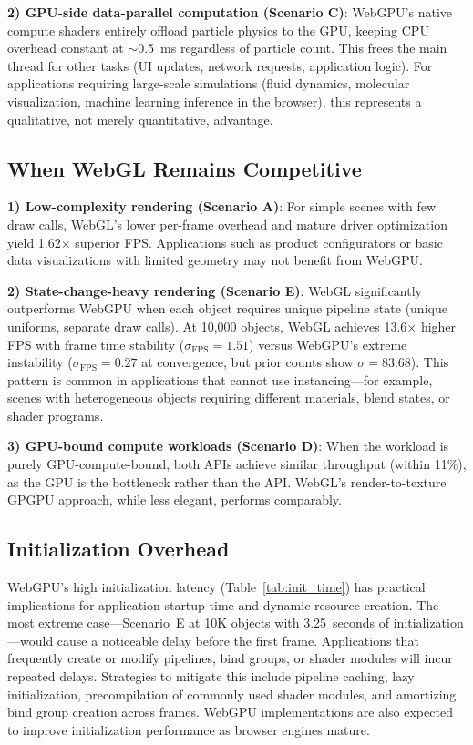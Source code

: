 \documentclass[conference]{IEEEtran}
\begin{document}
\textbf{2) GPU-side data-parallel computation (Scenario C)}: WebGPU's native compute shaders entirely offload particle physics to the GPU, keeping CPU overhead constant at $\sim$0.5~ms regardless of particle count. This frees the main thread for other tasks (UI updates, network requests, application logic). For applications requiring large-scale simulations (fluid dynamics, molecular visualization, machine learning inference in the browser), this represents a qualitative, not merely quantitative, advantage.

\subsection{When WebGL Remains Competitive}

\textbf{1) Low-complexity rendering (Scenario A)}: For simple scenes with few draw calls, WebGL's lower per-frame overhead and mature driver optimization yield 1.62$\times$ superior FPS. Applications such as product configurators or basic data visualizations with limited geometry may not benefit from WebGPU.

\textbf{2) State-change-heavy rendering (Scenario E)}: WebGL significantly outperforms WebGPU when each object requires unique pipeline state (unique uniforms, separate draw calls). At 10{,}000 objects, WebGL achieves 13.6$\times$ higher FPS with frame time stability ($\sigma_{\text{FPS}} = 1.51$) versus WebGPU's extreme instability ($\sigma_{\text{FPS}} = 0.27$ at convergence, but prior counts show $\sigma = 83.68$). This pattern is common in applications that cannot use instancing---for example, scenes with heterogeneous objects requiring different materials, blend states, or shader programs.

\textbf{3) GPU-bound compute workloads (Scenario D)}: When the workload is purely GPU-compute-bound, both APIs achieve similar throughput (within 11\%), as the GPU is the bottleneck rather than the API. WebGL's render-to-texture GPGPU approach, while less elegant, performs comparably.

\subsection{Initialization Overhead}

WebGPU's high initialization latency (Table~\ref{tab:init_time}) has practical implications for application startup time and dynamic resource creation. The most extreme case---Scenario~E at 10K objects with 3.25~seconds of initialization---would cause a noticeable delay before the first frame. Applications that frequently create or modify pipelines, bind groups, or shader modules will incur repeated delays. Strategies to mitigate this include pipeline caching, lazy initialization, precompilation of commonly used shader modules, and amortizing bind group creation across frames. WebGPU implementations are also expected to improve initialization performance as browser engines mature.
\end{document}
